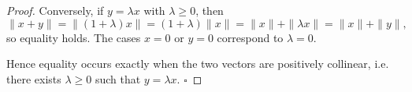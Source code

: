 \begin{proof}
Conversely, if \(y=\lambda x\) with \(\lambda\ge 0\), then
\[
\|x+y\|=\|(1+\lambda)x\|=(1+\lambda)\|x\|
       =\|x\|+\|\lambda x\|=\|x\|+\|y\|,
\]
so equality holds. The cases \(x=0\) or \(y=0\) correspond to \(\lambda=0\).

Hence equality occurs exactly when the two vectors are positively collinear,
i.e. there exists \(\lambda\ge 0\) such that \(y=\lambda x\). \(\square\)
\end{proof}